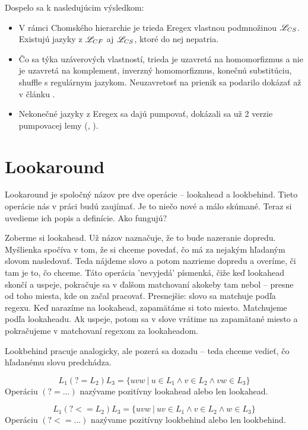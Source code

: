 Dospelo sa k nasledujúcim výsledkom:
\begin{itemize}
\item V rámci Chomského hierarchie je trieda Eregex vlastnou podmnožinou $\mathscr{L}_{CS}$. Existujú jazyky z $\mathscr{L}_{CF}$ aj $\mathscr{L}_{CS}$, ktoré do nej nepatria.
\item Čo sa týka uzáverových vlastností, trieda je uzavretá na homomorfizmus a nie je uzavretá na komplement, inverzný homomorfizmus, konečnú substitúciu, shuffle s regulárnym jazykom. Neuzavretosť na prienik sa podarilo dokázať až v článku \cite{ExtendedRegexIntersec}.
\item Nekonečné jazyky z Eregex sa dajú pumpovať, dokázali sa už 2 verzie pumpovacej lemy (\cite[Lemma 1]{ExtendedRegexPower}, \cite[Lemma 3]{ExtendedRegexIntersec}).
\end{itemize}

\section{Lookaround}
\label{dflookaround}

Lookaround je spoločný názov pre dve operácie -- lookahead a lookbehind. Tieto operácie nás v práci budú zaujímať. Je to niečo nové a málo skúmané. Teraz si uvedieme ich popis a definície. Ako fungujú? 

Zoberme si lookahead. Už názov naznačuje, že to bude nazeranie dopredu. Myšlienka spočíva v tom, že si chceme povedať, čo má za nejakým hľadaným slovom nasledovať. Teda nájdeme slovo a potom nazrieme dopredu a overíme, či tam je to, čo chceme. Táto operácia 'nevyjedá' písmenká, čiže keď lookahead skončí a uspeje, pokračuje sa v ďalšom matchovaní akokeby tam nebol -- presne od toho miesta, kde on začal pracovať. Presnejšie: slovo sa matchuje podľa regexu. Keď narazíme na lookahead, zapamätáme si toto miesto. Matchujeme podľa lookaheadu. Ak uspeje, potom sa v slove vrátime na zapamätané miesto a pokračujeme v matchovaní regexom za lookaheadom\cite{Python3Documentation}.

Lookbehind pracuje analogicky, ale pozerá sa dozadu -- teda chceme vedieť, čo hľadanému slovu predchádza. 

\begin{df}
$$ L_{1}(?=L_{2})L_{3} = \lbrace uvw ~|~ u \in L_{1} \land v \in L_{2} \land vw \in L_{3} \rbrace $$ Operáciu $(?=\dots)$ nazývame pozitívny lookahead alebo len lookahead.
\end{df}

\begin{df}
$$ L_{1}(?<=L_{2})L_{3} = \lbrace uvw ~|~ uv \in L_{1} \land v \in L_{2} \land w \in L_{3} \rbrace $$ Operáciu $(?<=\dots)$ nazývame pozitívny lookbehind alebo len lookbehind.
\end{df}

